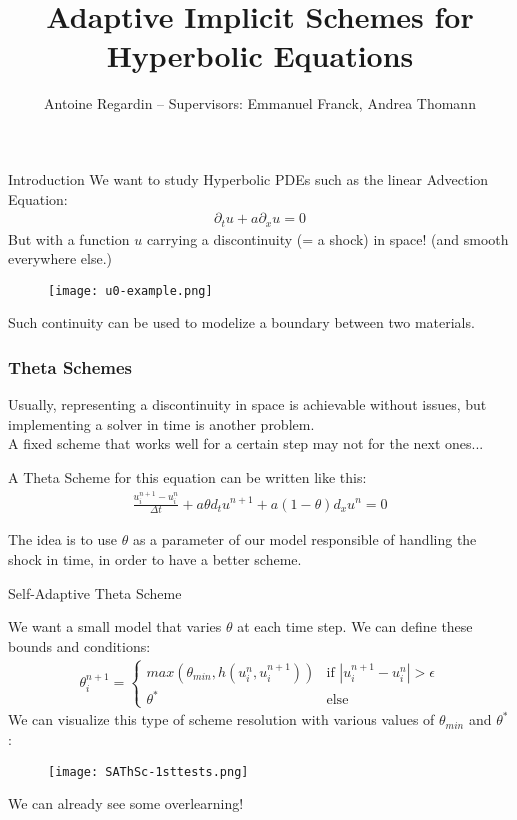 \documentclass[10pt]{beamer}
\title[Adaptive Implicit Schemes for Hyperbolic Equations]{Adaptive Implicit Schemes for Hyperbolic Equations}
\author[]{Antoine Regardin -- Supervisors: Emmanuel Franck, Andrea Thomann}
\begin{document}
\frame{\titlepage}

\begin{frame}{Introduction}
    We want to study Hyperbolic PDEs such as the linear Advection Equation:
    \begin{align*}
        \partial_t u + a\partial_x u = 0
    \end{align*}
    But with a function $u$ carrying a discontinuity (= a shock) in space! (and smooth everywhere else.)
    \begin{figure}
        \centering
        \texttt{[image: u0-example.png]}
    \end{figure}
    Such continuity can be used to modelize a boundary between two materials.
\end{frame}

\begin{frame}
\frametitle{Theta Schemes}
Usually, representing a discontinuity in space is achievable without issues, but implementing a solver in time is another problem. %
\\ A fixed scheme that works well for a certain step may not for the next ones...
\vspace{12pt}

A Theta Scheme for this equation can be written like this:
\begin{align*}
    \frac{u_i^{n+1} - u_i^n}{\Delta t} + a\theta d_t u^{n+1} + a(1-\theta) d_x u^n = 0
\end{align*}

The idea is to use $\theta$ as a parameter of our model responsible of handling the shock in time, in order to have a better scheme.

\end{frame}

\begin{frame}{Self-Adaptive Theta Scheme}

    We want a small model that varies $\theta$ at each time step. We can define these bounds and conditions:
    \begin{align*}
        \theta_i^{n+1} = \begin{cases}
            max(\theta_{min}, h(u_i^n, u_i^{n+1})) & \text{if } |u_i^{n+1} - u_i^n| > \epsilon \\
            \theta^* & \text{else} 
        \end{cases}
    \end{align*}
    We can visualize this type of scheme resolution with various values of $\theta_{min}$ and $\theta^*$:
    \begin{figure}
        \centering
        \texttt{[image: SAThSc-1sttests.png]}
    \end{figure}
    We can already see some overlearning!

\end{frame}
\end{document}
